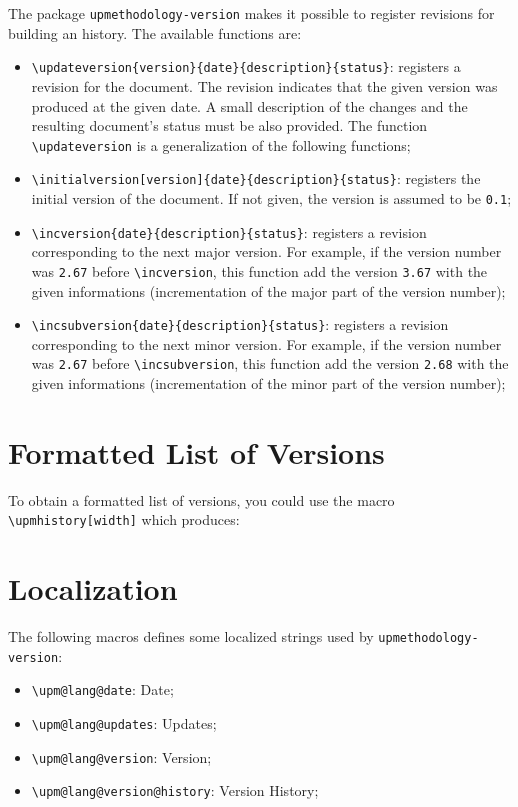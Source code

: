 \documentclass[book,taskpackage,specpackage,codepackage]{upmethodology-document}
\begin{document}
The package \texttt{upmethodology-version} makes it possible to register revisions for building an history. The available functions are:
\begin{itemize}
\item \texttt{{\textbackslash}updateversion\{version\}\{date\}\{description\}\{status\}}: registers a revision for the document. The revision indicates that the given version was produced at the given date. A small description of the changes and the resulting document's status must be also provided. The function \texttt{{\textbackslash}updateversion} is a generalization of the following functions;

\item \texttt{{\textbackslash}initialversion[version]\{date\}\{description\}\{status\}}: registers the initial version of the document. If not given, the version is assumed to be \texttt{0.1};

\item \texttt{{\textbackslash}incversion\{date\}\{description\}\{status\}}: registers a revision corresponding to the next major version. For example, if the version number was \texttt{2.67} before \texttt{{\textbackslash}incversion}, this function add the version \texttt{3.67} with the given informations (incrementation of the major part of the version number);

\item \texttt{{\textbackslash}incsubversion\{date\}\{description\}\{status\}}: registers a revision corresponding to the next minor version. For example, if the version number was \texttt{2.67} before \texttt{{\textbackslash}incsubversion}, this function add the version \texttt{2.68} with the given informations (incrementation of the minor part of the version number);
\end{itemize}

\section{Formatted List of Versions}

To obtain a formatted list of versions, you could use the macro \texttt{{\textbackslash}upmhistory[width]} which produces:

\upmhistory

\section{Localization}

The following macros defines some localized strings used by \texttt{upmethodology-version}:
\begin{itemize}
\item \texttt{{\textbackslash}upm@lang@date}: Date;
\item \texttt{{\textbackslash}upm@lang@updates}: Updates;
\item \texttt{{\textbackslash}upm@lang@version}: Version;
\item \texttt{{\textbackslash}upm@lang@version@history}: Version History;
\end{itemize}
\end{document}

